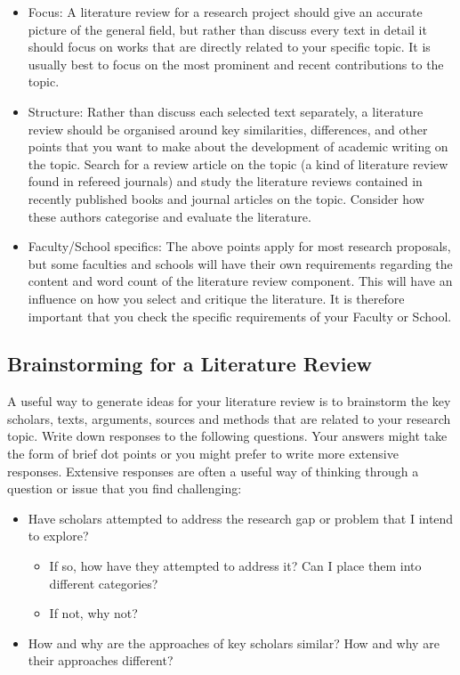 \documentclass[12pt, a4paper]{article}
\begin{document}
\begin{itemize}
\item Focus: A literature review for a research project should give an accurate picture of the general field, but rather than discuss every text in detail it should focus on works that are directly related to your specific topic. It is usually best to focus on the most prominent and recent contributions to the topic.
\item Structure: Rather than discuss each selected text separately, a literature review should be organised around key similarities, differences, and other points that you want to make about the development of academic writing on the topic. Search for a review article on the topic (a kind of literature review found in refereed journals) and study the literature reviews contained in recently published books and journal articles on the topic. Consider how these authors categorise and evaluate the literature.
\item Faculty/School specifics: The above points apply for most research proposals, but some faculties and schools will have their own requirements regarding the content and word count of the literature review component. This will have an influence on how you select and critique the literature. It is therefore important that you check the specific requirements of your Faculty or School.
\end{itemize}

\subsection{Brainstorming for a Literature Review}
A useful way to generate ideas for your literature review is to brainstorm the key scholars, texts, arguments, sources and methods that are related to your research topic. Write down responses to the following questions. Your answers might take the form of brief dot points or you might prefer to write more extensive responses. Extensive responses are often a useful way of thinking through a question or issue that you find challenging:
\begin{itemize}
\item Have scholars attempted to address the research gap or problem that I intend to explore?
	\begin{itemize}
		\item If so, how have they attempted to address it? Can I place them into different categories?
		\item If not, why not?
	\end{itemize}
\item How and why are the approaches of key scholars similar? How and why are their approaches different?
\end{itemize}
\end{document}
